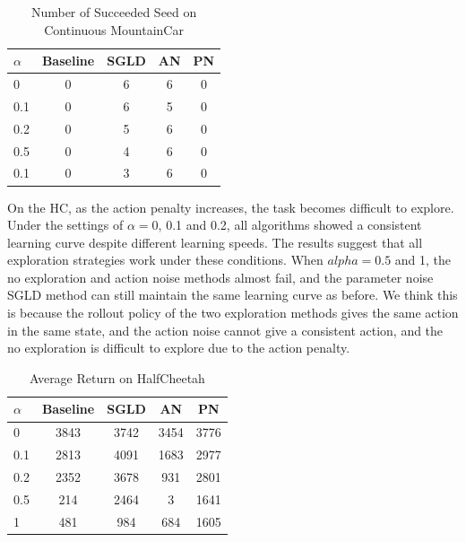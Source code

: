 \begin{table}[htbp]
   \caption{Number of Succeeded Seed on Continuous MountainCar}
   \label{tab:mc}
   \vskip 0.15in
   \begin{center}
   \begin{tabular}{lcccc}
   \toprule
   $\alpha$ & Baseline & SGLD & AN & PN \\
   \midrule
      0     & 0        & 6    & 6  & 0 \\
      0.1   & 0        & 6    & 5  & 0 \\
      0.2   & 0        & 5    & 6  & 0 \\
      0.5   & 0        & 4    & 6  & 0 \\
      0.1   & 0        & 3    & 6  & 0 \\
   \bottomrule
   \end{tabular}
   \end{center}
   \vskip -0.1in
   \end{table}

On the HC, as the action penalty increases, the task becomes difficult to explore. Under the settings of $\alpha=0$, 0.1 and 0.2, all algorithms showed a consistent learning curve despite different learning speeds. The results suggest that all exploration strategies work under these conditions. When $alpha=0.5$ and 1, the no exploration and action noise methods almost fail, and the parameter noise SGLD method can still maintain the same learning curve as before. We think this is because the rollout policy of the two exploration methods gives the same action in the same state, and the action noise cannot give a consistent action, and the no exploration is difficult to explore due to the action penalty.

\begin{table}[htbp]
   \caption{Average Return on HalfCheetah}
   \label{tab:HC}
   \vskip 0.15in
   \begin{center}
   \begin{tabular}{lcccc}
   \toprule
   $\alpha$ & Baseline & SGLD & AN   & PN \\
   \midrule
   0        & 3843     & 3742 & 3454 & 3776 \\
   0.1      & 2813     & 4091 & 1683 & 2977 \\
   0.2      & 2352     & 3678 & 931  & 2801 \\
   0.5      & 214      & 2464 & 3    & 1641 \\
   1        & 481      &  984 & 684  & 1605 \\
   \bottomrule
   \end{tabular}
   \end{center}
   \vskip -0.1in
   \end{table}



